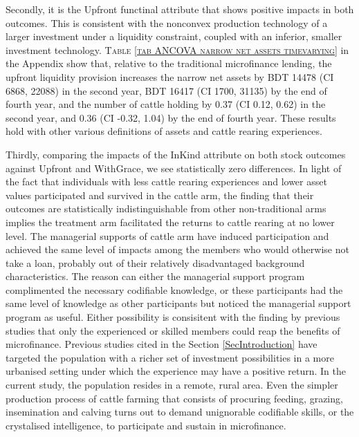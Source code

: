 	Secondly, it is the \textsf{Upfront} functinal attribute that shows positive impacts in both outcomes. %
	This is consistent with the nonconvex production technology of a larger investment under a liquidity constraint, coupled with an inferior, smaller investment technology. \textsc{\normalsize Table \ref{tab ANCOVA narrow net assets timevarying}} in the Appendix show that, relative to the traditional microfinance lending, the upfront liquidity provision increases the narrow net assets by BDT 
	14478 
	(CI 6868, 22088) in the second year, 
	BDT 16417 
	(CI 1700, 31135) by the end of fourth year, 
	and the number of cattle holding by 0.37 
	(CI 0.12, 0.62) in the second year, and 
	0.36 
	(CI -0.32, 1.04) by the end of fourth year. These results hold with other various definitions of assets and cattle rearing experiences.

	Thirdly, comparing the impacts of the \textsf{InKind} attribute on both stock outcomes against \textsf{Upfront} and \textsf{WithGrace}, we see statistically zero differences. In light of the fact that individuals with less cattle rearing experiences and lower asset values participated and survived in the \textsf{cattle} arm, the finding that their outcomes are statistically indistinguishable from other non-\textsf{traditional} arms implies the treatment arm facilitated the returns to cattle rearing at no lower level. The managerial supports of \textsf{cattle} arm have induced participation and achieved the same level of impacts among the members who would otherwise not take a loan, probably out of their relatively disadvantaged background characteristics. The reason can either the managerial support program complimented the necessary codifiable knowledge, or these participants had the same level of knowledge as other participants but noticed the managerial support program as useful. Either possibility is consisitent with the finding by previous studies that only the experienced or skilled members could reap the benefits of microfinance. Previous studies cited in the Section \ref{SecIntroduction} have targeted the population with a richer set of investment possibilities in a more urbanised setting under which the experience may have a positive return. In the current study, the population resides in a remote, rural area. Even the simpler production process of cattle farming that consists of procuring feeding, grazing, insemination and calving turns out to demand unignorable codifiable skills, or the crystalised intelligence, to participate and sustain in microfinance.
	
